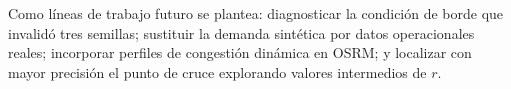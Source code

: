 \documentclass[12pt,letterpaper]{article}
\begin{document}
Como líneas de trabajo futuro se plantea: diagnosticar la condición de borde que
invalidó tres semillas; sustituir la demanda sintética por datos operacionales
reales; incorporar perfiles de congestión dinámica en OSRM; y localizar con mayor
precisión el punto de cruce explorando valores intermedios de $r$.



\end{document}
